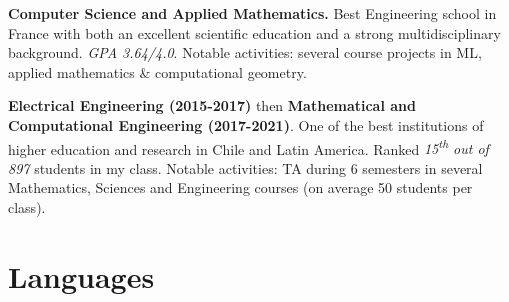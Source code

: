 \documentclass[11pt,a4paper,roman]{moderncv} %
\begin{document}
    {\textbf{Computer Science and Applied Mathematics.} Best Engineering school in France with both an excellent scientific education and a strong multidisciplinary background. \textit{GPA 3.64/4.0}. Notable activities: several course projects in ML, applied mathematics \& computational geometry.}
    
    {\textbf{Electrical Engineering (2015-2017)} then \textbf{Mathematical and Computational Engineering (2017-2021)}. One of the best institutions of higher education and research in Chile and Latin America. Ranked \textit{15\textsuperscript{th} out of 897} students in my class. Notable activities: TA during 6 semesters in several Mathematics, Sciences and Engineering courses (on average 50 students per class).}



\section{Languages}

\end{document}
